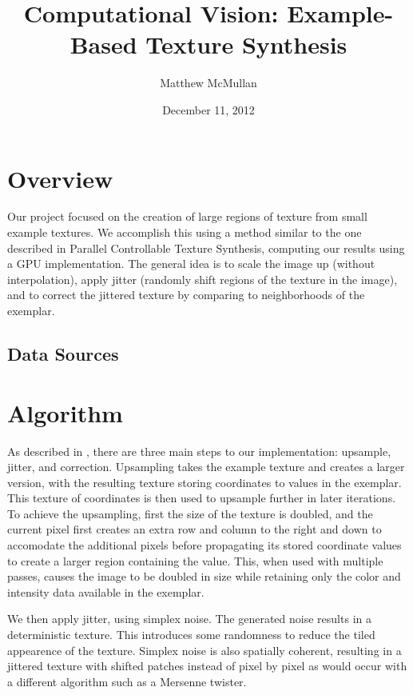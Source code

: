 \documentclass[12pt, twocolumn]{article}
\title{Computational Vision: Example-Based Texture Synthesis}
\author{Matthew McMullan}
\date{December 11, 2012}
\begin{document}
    \maketitle
    \section{Overview}
        Our project focused on the creation of large regions of texture from small example textures.  We accomplish this using a method similar to the one described in Parallel Controllable Texture Synthesis, computing our results using a GPU implementation.  The general idea is to scale the image up (without interpolation), apply jitter (randomly shift regions of the texture in the image), and to correct the jittered texture by comparing to neighborhoods of the exemplar.
        \subsection{Data Sources}

    \section{Algorithm}
        As described in \cite{paratext}, there are three main steps to our implementation: upsample, jitter, and correction.  Upsampling takes the example texture and creates a larger version, with the resulting texture storing coordinates to values in the exemplar.  This texture of coordinates is then used to upsample further in later iterations.  To achieve the upsampling, first the size of the texture is doubled, and the current pixel first creates an extra row and column to the right and down to accomodate the additional pixels before propagating its stored coordinate values to create a larger region containing the value.  This, when used with multiple passes, causes the image to be doubled in size while retaining only the color and intensity data available in the exemplar.%

        We then apply jitter, using simplex noise.  The generated noise results in a deterministic texture.  This introduces some randomness to reduce the tiled appearence of the texture.  Simplex noise is also spatially coherent, resulting in a jittered texture with shifted patches instead of pixel by pixel as would occur with a different algorithm such as a Mersenne twister.
\end{document}
